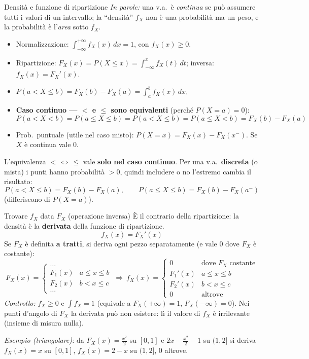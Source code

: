 \documentclass[11pt]{article}
\newcommand{\inparole}[1]{\emph{In parole:} #1}
\begin{document}
\begin{concetto}[barGreen]{Densit\`a e funzione di ripartizione}
\inparole{una v.a.\ \`e \emph{continua} se pu\`o assumere tutti i valori di un intervallo; la ``densit\`a'' $f_X$ non \`e una probabilit\`a ma un peso, e la probabilit\`a \`e l'\emph{area} sotto $f_X$.}
\begin{itemize}[leftmargin=1.2em,itemsep=2pt,topsep=2pt]
\item Normalizzazione: $\int_{-\infty}^{+\infty} f_X(x)\,dx = 1$, con $f_X(x)\ge 0$.
\item Ripartizione: $F_X(x) = P(X \le x) = \int_{-\infty}^{x} f_X(t)\,dt$; \; inversa: $f_X(x)=F_X'(x)$.
\item $P(a<X\le b) = F_X(b)-F_X(a) = \int_a^b f_X(x)\,dx$.
\item \textbf{Caso continuo --- $<$ e $\le$ sono equivalenti} (perch\'e $P(X=a)=0$):
\[ P(a<X<b) = P(a\le X\le b) = P(a<X\le b) = P(a\le X<b) = F_X(b)-F_X(a) \]
\item Prob.\ puntuale (utile nel caso misto): $P(X=x) = F_X(x) - F_X(x^-)$. Se $X$ \`e continua vale $0$.
\end{itemize}
\end{concetto}

\begin{attenzione}
L'equivalenza $<\,\Leftrightarrow\,\le$ vale \textbf{solo nel caso continuo}. Per una v.a.\ \textbf{discreta} (o mista) i punti hanno probabilit\`a $>0$, quindi includere o no l'estremo cambia il risultato:
\[ P(a<X\le b) = F_X(b)-F_X(a), \qquad P(a\le X\le b) = F_X(b)-F_X(a^-) \]
(differiscono di $P(X=a)$).
\end{attenzione}

\begin{concetto}[barGreen]{Trovare $f_X$ data $F_X$ (operazione inversa)}
\`E il contrario della ripartizione: la densit\`a \`e la \textbf{derivata} della funzione di ripartizione.
\[ \boxed{\ f_X(x) = F_X'(x)\ } \]
Se $F_X$ \`e definita \textbf{a tratti}, si deriva ogni pezzo separatamente (e vale $0$ dove $F_X$ \`e costante):
\[ F_X(x)=\begin{cases}\dots \\ F_1(x) & a\le x\le b \\ F_2(x) & b< x\le c \\ \dots\end{cases} \ \Longrightarrow\ f_X(x)=\begin{cases}0 & \text{dove }F_X \text{ costante} \\ F_1'(x) & a\le x\le b \\ F_2'(x) & b< x\le c \\ 0 & \text{altrove}\end{cases} \]
\emph{Controllo:} $f_X\ge0$ e $\int f_X = 1$ (equivale a $F_X(+\infty)=1$, $F_X(-\infty)=0$). Nei punti d'angolo di $F_X$ la derivata pu\`o non esistere: l\`i il valore di $f_X$ \`e irrilevante (insieme di misura nulla).

\emph{Esempio (triangolare):} da $F_X(x)=\frac{x^2}{2}$ su $[0,1]$ e $2x-\frac{x^2}{2}-1$ su $(1,2]$ si deriva $f_X(x)=x$ su $[0,1]$, $f_X(x)=2-x$ su $(1,2]$, $0$ altrove.
\end{concetto}
\end{document}
